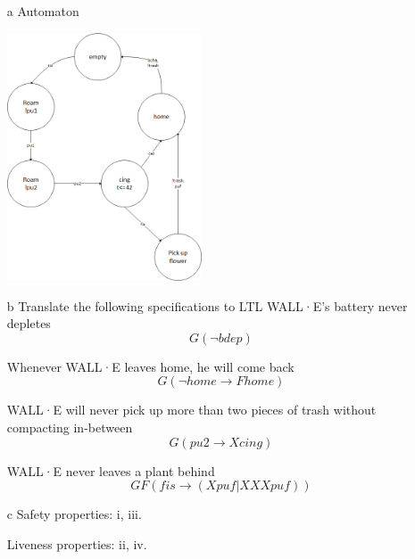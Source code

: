 \documentclass[]{article}
\begin{document}
\begin{itemize}
	\item [a] Automaton
	
	\begin{center}
	\includegraphics[height=2.9in]{E3}
	\end{center}
	
	\item[b] Translate the following specifications to LTL
	\subitem[i] WALL·E’s battery never depletes
	$$G(\neg bdep )$$
	
	\subitem[ii] Whenever WALL·E leaves home, he will come back
	$$G(\neg home \rightarrow Fhome)$$
	
	\subitem[iii] WALL·E will never pick up more than two pieces of trash without compacting in-between
	$$G(pu2 \rightarrow X cing)$$
	
	\subitem[iv] WALL·E never leaves a plant behind
	$$GF(fis \rightarrow (X puf | XXX puf))$$
	
	\item [c] Safety properties: i, iii.
	
	Liveness properties: ii, iv.
	

\end{itemize}
\end{document}
